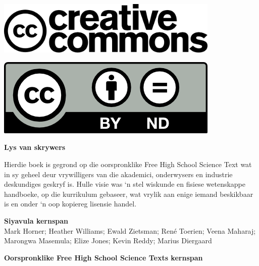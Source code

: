 \vspace*{4in}

\begin{center}
\begin{minipage}{0.6\textwidth}
\includegraphics[width=0.8\textwidth]{title_images/cc2.png}
\end{minipage}
\begin{minipage}{0.3\textwidth}
\includegraphics[width=0.8\textwidth]{title_images/cc1.png}
\end{minipage}
\end{center}







\newpage
\thispagestyle{empty}


\begin{flushleft} \textbf{\huge Lys van skrywers} \end{flushleft}

{\Large Hierdie boek is gegrond op die oorspronklike Free High School Science Text wat in sy geheel deur vrywilligers van die akademici, onderwysers en industrie deskundiges geskryf is. Hulle visie was ‘n stel wiskunde en fisiese wetenskappe handboeke, op die kurrikulum gebaseer, wat vrylik aan enige iemand beskikbaar is en onder ‘n oop kopiereg lisensie handel. } \par

\textbf{\Large Siyavula kernspan} \\

Mark Horner; Heather Williams; Ewald Zietsman; Ren\'{e} Toerien; Veena Maharaj; Marongwa Masemula; Elize Jones; Kevin Reddy; Marius Diergaard \par

\textbf{\Large Oorspronklike Free High School Science Texts kernspan}\\

